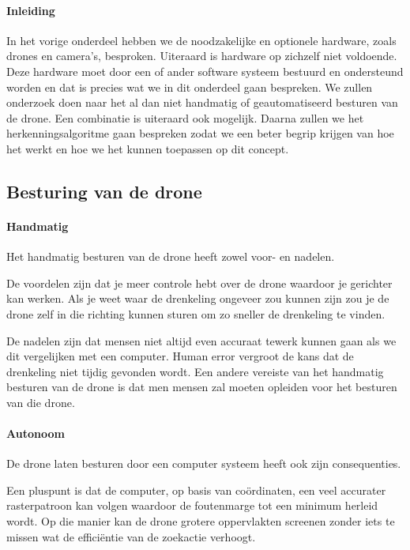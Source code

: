 \paragraph{Inleiding}
In het vorige onderdeel hebben we de noodzakelijke en optionele hardware, zoals drones en camera's, besproken. Uiteraard is hardware op zichzelf niet voldoende. Deze hardware moet door een of ander software systeem bestuurd en ondersteund worden en dat is precies wat we in dit onderdeel gaan bespreken. We zullen onderzoek doen naar het al dan niet handmatig of geautomatiseerd besturen van de drone. Een combinatie is uiteraard ook mogelijk. Daarna zullen we het herkenningsalgoritme gaan bespreken zodat we een beter begrip krijgen van hoe het werkt en hoe we het kunnen toepassen op dit concept.

\subsection{Besturing van de drone}

\paragraph{Handmatig}

Het handmatig besturen van de drone heeft zowel voor- en nadelen. 

De voordelen zijn dat je meer controle hebt over de drone waardoor je gerichter kan werken. Als je weet waar de drenkeling ongeveer zou kunnen zijn zou je de drone zelf in die richting kunnen sturen om zo sneller de drenkeling te vinden. 

De nadelen zijn dat mensen niet altijd even accuraat tewerk kunnen gaan als we dit vergelijken met een computer. Human error vergroot de kans dat de drenkeling niet tijdig gevonden wordt. Een andere vereiste van het handmatig besturen van de drone is dat men mensen zal moeten opleiden voor het besturen van die drone.

\paragraph{Autonoom}

De drone laten besturen door een computer systeem heeft ook zijn consequenties. 

Een pluspunt is dat de computer, op basis van coördinaten, een veel accurater rasterpatroon kan volgen waardoor de foutenmarge tot een minimum herleid wordt. Op die manier kan de drone grotere oppervlakten screenen zonder iets te missen wat de efficiëntie van de zoekactie verhoogt. 

